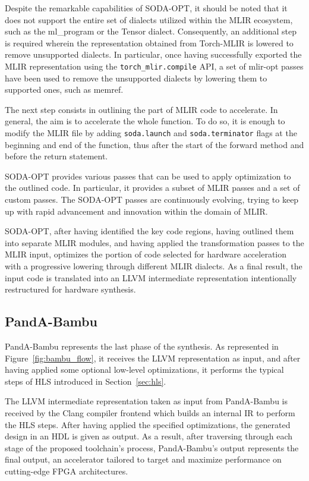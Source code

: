 Despite the remarkable capabilities of SODA-OPT, it should be noted that it does not support the entire set of dialects utilized within the MLIR ecosystem, such as the ml\_program or the Tensor dialect.
Consequently, an additional step is required wherein the representation obtained from Torch-MLIR is lowered to remove unsupported dialects.
In particular, once having successfully exported the MLIR representation using the \lstinline{torch_mlir.compile} API, a set of mlir-opt passes have been used to remove the unsupported dialects by lowering them to supported ones, such as memref.

The next step consists in outlining the part of MLIR code to accelerate.
In general, the aim is to accelerate the whole function.
To do so, it is enough to modify the MLIR file by adding \lstinline{soda.launch} and \lstinline{soda.terminator} flags at the beginning and end of the function, thus after the start of the forward method and before the return statement.

SODA-OPT provides various passes that can be used to apply optimization to the outlined code.
In particular, it provides a subset of MLIR passes and a set of custom passes.
The SODA-OPT passes are continuously evolving, trying to keep up with rapid advancement and innovation within the domain of MLIR\@.

SODA-OPT, after having identified the key code regions, having outlined them into separate MLIR modules, and having applied the transformation passes to the MLIR input, optimizes the portion of code selected for hardware acceleration with a progressive lowering through different MLIR dialects.
As a final result, the input code is translated into an LLVM intermediate representation intentionally restructured for hardware synthesis.

\subsection{PandA-Bambu}
\label{subsec:toolchain-panda_bambu}%

PandA-Bambu represents the last phase of the synthesis.
As represented in Figure~\ref{fig:bambu_flow}, it receives the LLVM representation as input, and after having applied some optional low-level optimizations, it performs the typical steps of HLS introduced in Section~\ref{sec:hls}.

The LLVM intermediate representation taken as input from PandA-Bambu is received by the Clang compiler frontend which builds an internal IR to perform the HLS steps.
After having applied the specified optimizations, the generated design in an HDL is given as output.
As a result, after traversing through each stage of the proposed toolchain's process, PandA-Bambu's output represents the final output, an accelerator tailored to target and maximize performance on cutting-edge FPGA architectures.

